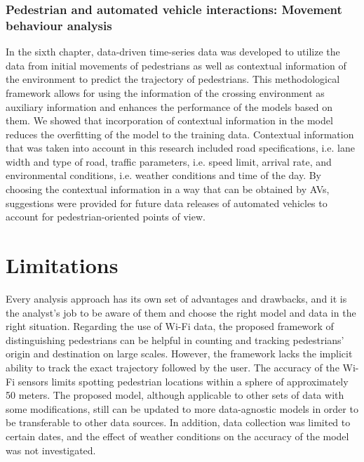 \subsubsection*{Pedestrian and automated vehicle interactions: Movement behaviour analysis}
In the sixth chapter, data-driven time-series data was developed to utilize the data from initial movements of pedestrians as well as contextual information of the environment to predict the trajectory of pedestrians. This methodological framework allows for using the information of the crossing environment as auxiliary information and enhances the performance of the models based on them. We showed that incorporation of contextual information in the model reduces the overfitting of the model to the training data. Contextual information that was taken into account in this research included road specifications, i.e. lane width and type of road, traffic parameters, i.e. speed limit, arrival rate, and environmental conditions, i.e. weather conditions and time of the day. By choosing the contextual information in a way that can be obtained by AVs, suggestions were provided for future data releases of automated vehicles to account for pedestrian-oriented points of view.

\section{Limitations}
\label{chap7:sec2}
Every analysis approach has its own set of advantages and drawbacks, and it is the analyst's job to be aware of them and choose the right model and data in the right situation. Regarding the use of Wi-Fi data, the proposed framework of distinguishing pedestrians can be helpful in counting and tracking pedestrians' origin and destination on large scales. However, the framework lacks the implicit ability to track the exact trajectory followed by the user. The accuracy of the Wi-Fi sensors limits spotting pedestrian locations within a sphere of approximately 50 meters. The proposed model, although applicable to other sets of data with some modifications, still can be updated to more data-agnostic models in order to be transferable to other data sources. In addition, data collection was limited to certain dates, and the effect of weather conditions on the accuracy of the model was not investigated. 

